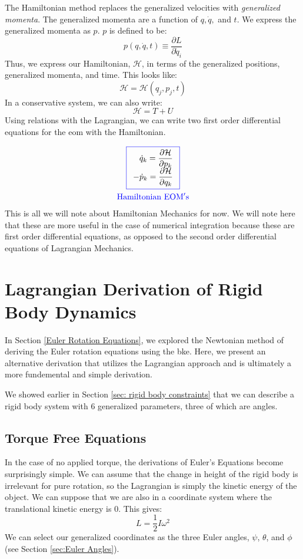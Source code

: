 \documentclass[12pt]{report}
\begin{document}
The Hamiltonian method replaces the generalized velocities with \textit{generalized momenta}. The generalized momenta are a function of $q,\dot{q},$ and $t$. We express the generalized momenta as $p$. $p$ is defined to be:
$$p(q,\dot{q},t)\equiv\dfrac{\partial L}{\partial \dot{q}_i}$$
Thus, we express our Hamiltonian, $\mathcal{H}$, in terms of the generalized positions, generalized momenta, and time. This looks like:
$$\mathcal{H}=\mathcal{H}(q_j,p_j,t)$$
In a conservative system, we can also write: $$\mathcal{H}=T+U$$
Using relations with the \gls{Lagrangian}, we can write two first order differential equations for the \gls{eom} with the Hamiltonian.

\begin{gather}
\color{blue}\boxed{
\begin{array}{r}\color{black}
     \dot{q}_k=\dfrac{\partial \mathcal{H}}{\partial p_k}\\
     \color{black}
  -\dot{p}_k=\dfrac{\partial \mathcal{H}}{\partial q_k}
\end{array}
}\\
\color{blue}\mathrm{Hamiltonian \ EOM's}
\end{gather}
This is all we will note about Hamiltonian Mechanics for now. We will note here that these are more useful in the case of numerical integration because these are first order differential equations, as opposed to the second order differential equations of Lagrangian Mechanics.
\section{Lagrangian Derivation of Rigid Body Dynamics}

In Section \ref{Euler Rotation Equations}, we explored the Newtonian method of deriving the Euler rotation equations using the \gls{bke}. Here, we present an alternative derivation that utilizes the \gls{Lagrangian} approach and is ultimately a more fundemental and simple derivation.

We showed earlier in Section \ref{sec: rigid body constraints} that we can describe a rigid body system with 6 generalized parameters, three of which are angles.
\subsection{Torque Free Equations}
In the case of no applied torque, the derivations of Euler's Equations become surprisingly simple. We can assume that the change in height of the rigid body is irrelevant for pure rotation, so the \gls{Lagrangian} is simply the kinetic energy of the object. We can suppose that we are also in a coordinate system where the translational kinetic energy is 0. This gives:
\begin{equation}\label{eq:rigid body KE}
L=\frac{1}{2}I\omega^2
\end{equation}
We can select our generalized coordinates as the three Euler angles, $\psi$, $\theta$, and $\phi$ (see Section \ref{sec:Euler Angles}).
\end{document}
